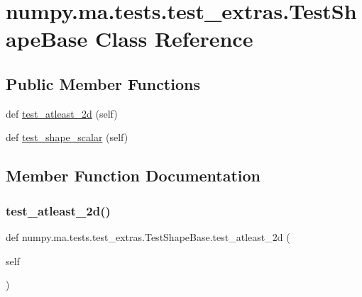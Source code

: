 \hypertarget{classnumpy_1_1ma_1_1tests_1_1test__extras_1_1TestShapeBase}{}\section{numpy.\+ma.\+tests.\+test\+\_\+extras.\+Test\+Shape\+Base Class Reference}
\label{classnumpy_1_1ma_1_1tests_1_1test__extras_1_1TestShapeBase}
\subsection*{Public Member Functions}
\begin{DoxyCompactItemize}
\item 
def \hyperlink{classnumpy_1_1ma_1_1tests_1_1test__extras_1_1TestShapeBase_adb6b1f4eda3237b9d48ec66ed0bd6e84}{test\+\_\+atleast\+\_\+2d} (self)
\item 
def \hyperlink{classnumpy_1_1ma_1_1tests_1_1test__extras_1_1TestShapeBase_a7f2ad694b13bcad5950cd9be67246be2}{test\+\_\+shape\+\_\+scalar} (self)
\end{DoxyCompactItemize}


\subsection{Member Function Documentation}
\mbox{\label{classnumpy_1_1ma_1_1tests_1_1test__extras_1_1TestShapeBase_adb6b1f4eda3237b9d48ec66ed0bd6e84}} 
\subsubsection{\texorpdfstring{test\+\_\+atleast\+\_\+2d()}{test\_atleast\_2d()}}
{\footnotesize\ttfamily def numpy.\+ma.\+tests.\+test\+\_\+extras.\+Test\+Shape\+Base.\+test\+\_\+atleast\+\_\+2d (\begin{DoxyParamCaption}\item[{}]{self }\end{DoxyParamCaption})}

